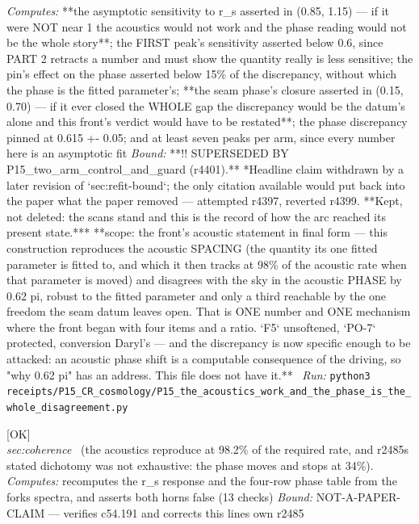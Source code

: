 \begin{description}
\emph{Computes:} **the asymptotic sensitivity to r\_s asserted in (0.85, 1.15) --- if it were NOT near 1 the acoustics would not work and the phase reading would not be the whole story**; the FIRST peak's sensitivity asserted below 0.6, since PART 2 retracts a number and must show the quantity really is less sensitive; the pin's effect on the phase asserted below 15\% of the discrepancy, without which the phase is the fitted parameter's; **the seam phase's closure asserted in (0.15, 0.70) --- if it ever closed the WHOLE gap the discrepancy would be the datum's alone and this front's verdict would have to be restated**; the phase discrepancy pinned at 0.615 +- 0.05; and at least seven peaks per arm, since every number here is an asymptotic fit
 \emph{Bound:} **!! SUPERSEDED BY P15\_two\_arm\_control\_and\_guard (r4401).** *Headline claim withdrawn by a later revision of `sec:refit-bound`; the only citation available would put back into the paper what the paper removed --- attempted r4397, reverted r4399. **Kept, not deleted: the scans stand and this is the record of how the arc reached its present state.*** **scope: the front's acoustic statement in final form --- this construction reproduces the acoustic SPACING (the quantity its one fitted parameter is fitted to, and which it then tracks at 98\% of the acoustic rate when that parameter is moved) and disagrees with the sky in the acoustic PHASE by 0.62 pi, robust to the fitted parameter and only a third reachable by the one freedom the seam datum leaves open. That is ONE number and ONE mechanism where the front began with four items and a ratio. `F5` unsoftened, `PO-7` protected, conversion Daryl's --- and the discrepancy is now specific enough to be attacked: an acoustic phase shift is a computable consequence of the driving, so "why 0.62 pi" has an address. This file does not have it.**
\ \emph{Run:} \texttt{python3 receipts/P15\_CR\_cosmology/P15\_the\_acoustics\_work\_and\_the\_phase\_is\_the\_whole\_disagreement.py}
\item[\label{rcpt:B6_the_acoustics_reproduce_and_the_dichotomy_is_false}\textbf{}\quad\texttt{B6\_the\_acoustics\_reproduce\_and\_the\_dichotomy\_is\_false}]\hfill\textsf{[OK]}\\
\textit{sec:coherence} \ (the acoustics reproduce at 98.2\% of the required rate, and r2485s stated dichotomy was not exhaustive: the phase moves and stops at 34\%). 
\emph{Computes:} recomputes the r\_s response and the four-row phase table from the forks spectra, and asserts both horns false (13 checks)
 \emph{Bound:} NOT-A-PAPER-CLAIM --- verifies c54.191 and corrects this lines own r2485

\end{description}

